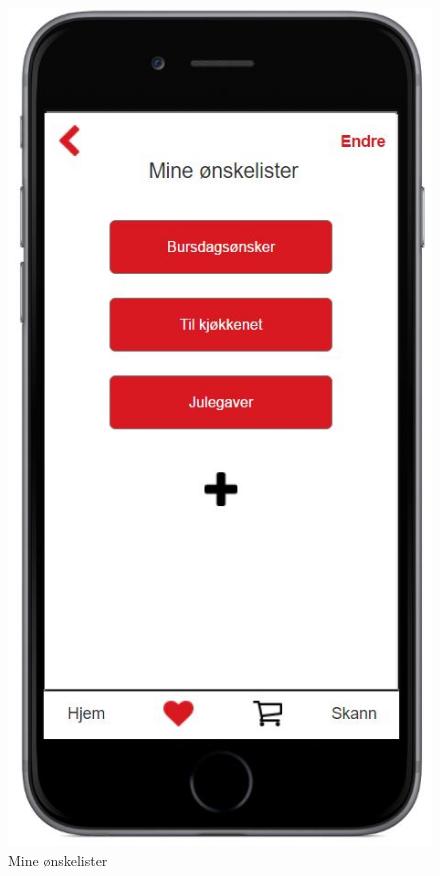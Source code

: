 \begin{figure}[H]
\includegraphics[scale=0.55]{images/axurebilder/mine_onskelister_2}
\centering %
\caption{Mine ønskelister}
\label{fig:mine_onskelister_2}
\end{figure}

